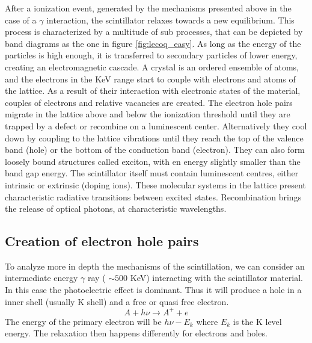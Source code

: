 After a ionization event, generated by the mechanisms presented above in the case of a $\gamma$ interaction, the scintillator relaxes towards a new equilibrium. This process is characterized by a multitude of sub processes, that can be depicted by band diagrams as the one in figure \ref{fig:lecoq_easy}.
As long as the energy of the particles is high enough, it is transferred to secondary particles of lower energy, creating an electromagnetic cascade.
A crystal is an ordered ensemble of atoms, and the electrons in the KeV range start to couple with electrons and atoms of the lattice. As a result of their interaction with electronic states of the material, couples of electrons and relative vacancies are created. The electron hole pairs migrate in the lattice above and below the ionization threshold until they are trapped by a defect or recombine on a luminescent center. Alternatively they cool down by coupling to the lattice vibrations until they reach the top of the valence band (hole) or the bottom of the conduction band (electron). They can also form loosely bound structures called exciton, with en energy slightly smaller than the band gap energy.
The scintillator itself must contain luminescent centres, either intrinsic or extrinsic (doping ions). These molecular systems in the lattice present characteristic radiative transitions between excited states.
Recombination brings the release of optical photons, at characteristic wavelengths.
%
%

\subsection{Creation of electron hole pairs}

To analyze more in depth the mechanisms of the scintillation, we can consider an intermediate energy $\gamma$ ray ( $\sim 500$ KeV) interacting with the scintillator material. In this case the photoelectric effect is dominant. Thus it will produce a hole in a inner shell (usually K shell) and a free or quasi free electron.
\begin{equation}
A + h\nu \rightarrow A^{+} + e
\end{equation}
The energy of the primary electron will be $h\nu - E_{k}$ where $E_{k}$ is the K level energy. The relaxation then happens differently for electrons and holes. 

